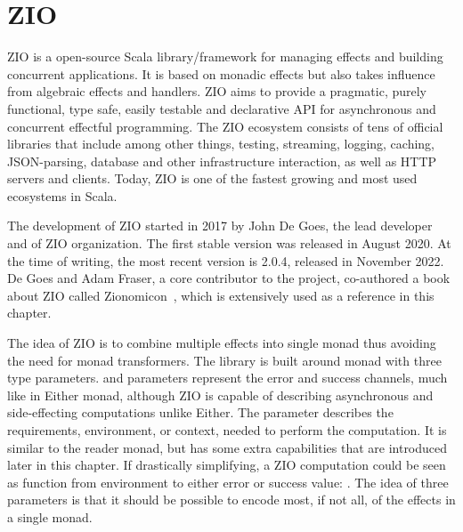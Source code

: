 \chapter{ZIO} \label{zio}
ZIO is a open-source Scala library/framework for managing effects and building concurrent applications. It is based on monadic effects but also takes influence from algebraic effects and handlers. ZIO aims to provide a pragmatic, purely functional, type safe, easily testable and declarative API for asynchronous and concurrent effectful programming. The ZIO ecosystem consists of tens of official libraries that include among other things, testing, streaming, logging, caching, JSON-parsing, database and other infrastructure interaction, as well as HTTP servers and clients.  Today, ZIO is one of the fastest growing and most used ecosystems in Scala.

The development of ZIO started in 2017 by John De Goes, the lead developer and  of ZIO organization. The first stable version was released in August 2020. At the time of writing, the most recent version is 2.0.4, released in November 2022. De Goes and Adam Fraser, a core contributor to the project, co-authored a book about ZIO called Zionomicon~\cite{zionomicon}, which is extensively used as a reference in this chapter.

The idea of ZIO is to combine multiple effects into single monad thus avoiding the need for monad transformers. The library is built around  monad with three type parameters.  and  parameters represent the error and success channels, much like in Either monad, although ZIO is capable of describing asynchronous and side-effecting computations unlike Either. The  parameter describes the requirements, environment, or context, needed to perform the computation. It is similar to the reader monad, but has some extra capabilities that are introduced later in this chapter. If drastically simplifying, a ZIO computation could be seen as function from environment to either error or success value: . The idea of three parameters is that it should be possible to encode most, if not all, of the effects in a single monad. 

